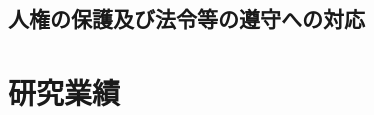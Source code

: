 \documentclass[11pt,a4paper,twoside,dvipdfmx]{jarticle}		%
\newcommand{\研究課題名}{粒子加速器を用いた電弱相互作用を持つ新物理の探索}
\newcommand{\研究機関名}{東京大学}
\newcommand{\申請者氏名}{千草颯}
\newcommand{\研究代表者氏名}{\申請者氏名}
\newcommand{\研究期間の最終元号年度}{34}	%
\begin{document}
\subsection{人権の保護及び法令等の遵守への対応}
\newcommand{\受け入れ研究室の選定理由}{%



}

\newcommand{\人権の保護及び法令等の遵守への対応}{%

該当しない。

}

\section{研究業績}
\end{document}
